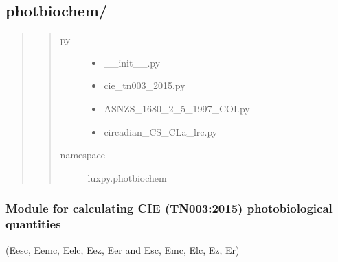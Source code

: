 \documentclass[letterpaper,10pt,english]{sphinxmanual}
\begin{document}
\subsection{photbiochem/}
\label{\detokenize{toolboxes:photbiochem}}\begin{quote}
\begin{quote}\begin{description}
\item[{py}] \leavevmode\begin{itemize}
\item {} 
\_\_init\_\_.py

\item {} 
cie\_tn003\_2015.py

\item {} 
ASNZS\_1680\_2\_5\_1997\_COI.py

\item {} 
circadian\_CS\_CLa\_lrc.py

\end{itemize}

\item[{namespace}] \leavevmode
luxpy.photbiochem

\end{description}\end{quote}
\end{quote}
\label{\detokenize{toolboxes:module-luxpy.toolboxes.photbiochem}}

\subsubsection{Module for calculating CIE (TN003:2015) photobiological quantities}
\label{\detokenize{toolboxes:module-for-calculating-cie-tn003-2015-photobiological-quantities}}
(Eesc, Eemc, Eelc, Eez, Eer and Esc, Emc, Elc, Ez, Er)
\end{document}

